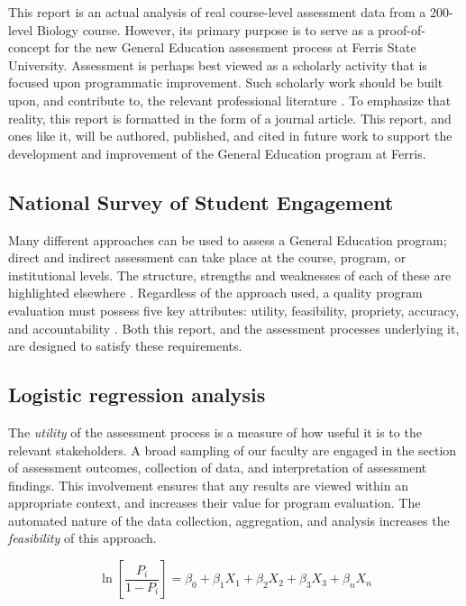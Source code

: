 \documentclass[fleqn,10pt]{SelfArx}\usepackage[]{graphicx}\usepackage[]{color}
\begin{document}
This report is an actual analysis of real course-level assessment data from a 200-level Biology course. However, its primary purpose is to serve as a proof-of-concept for the new General Education assessment process at Ferris State University. Assessment is perhaps best viewed as a scholarly activity that is focused upon programmatic improvement. Such scholarly work should be built upon, and contribute to, the relevant professional literature \citep{Weimer2015}. To emphasize that reality, this report is formatted in the form of a journal article. This report, and ones like it, will be authored, published, and cited in future work to support the development and improvement of the General Education program at Ferris.

\subsection{National Survey of Student Engagement} Many different approaches can be used to assess a General Education program; direct and indirect assessment can take place at the course, program, or institutional levels. The structure, strengths and weaknesses of each of these are highlighted elsewhere \citep{Allen2006a}. Regardless of the approach used, a quality program evaluation must possess five key attributes: utility, feasibility, propriety, accuracy, and accountability \citep{Yarbrough2011}. Both this report, and the assessment processes underlying it, are designed to satisfy these requirements.

\subsection{Logistic regression analysis} The \textit{utility} of the assessment process is a measure of how useful it is to the relevant stakeholders. A broad sampling of our faculty are engaged in the section of assessment outcomes, collection of data, and interpretation of assessment findings. This involvement ensures that any results are viewed within an appropriate context, and increases their value for program evaluation. The automated nature of the data collection, aggregation, and analysis increases the \textit{feasibility} of this approach.

\begin{equation}
\ln\left[\frac{P_{i}}{1-P_{i}}\right]=\beta_{0}+\beta_{1}X_{1}+\beta_{2}X_{2}+\beta_{3}X_{3}+\beta_{n}X_{n}
\end{equation}
\end{document}
